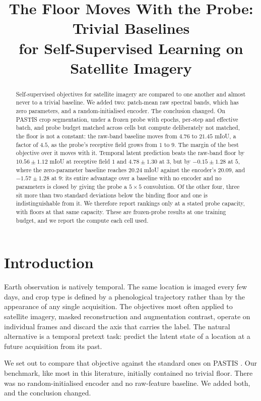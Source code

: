 \documentclass{article}
\title{The Floor Moves With the Probe: Trivial Baselines\\
       for Self-Supervised Learning on Satellite Imagery}
\author{}   %
\begin{document}
\maketitle

\begin{abstract}
Self-supervised objectives for satellite imagery are compared to one another and almost never to a
trivial baseline. We added two: patch-mean raw spectral bands, which has zero parameters, and a
random-initialised encoder. The conclusion changed. On PASTIS crop segmentation, under a frozen
probe with epochs, per-step and effective batch, and probe budget matched across cells but compute
deliberately not matched, the floor is not a constant: the raw-band baseline moves from $4.76$ to $21.45$ mIoU, a factor of $4.5$, as the probe's
receptive field grows from $1$ to $9$. The margin of the best objective over it moves with it.
Temporal latent prediction beats the raw-band floor by $10.56 \pm 1.12$ mIoU at receptive field $1$
and $4.78 \pm 1.30$ at $3$, but by $-0.15 \pm 1.28$ at $5$, where the zero-parameter baseline reaches
$20.24$ mIoU against the encoder's $20.09$, and $-1.57 \pm 1.28$ at $9$: its entire advantage over a
baseline with no encoder and no parameters is closed by giving the probe a $5{\times}5$ convolution. Of the other four, three sit more than two standard deviations below the
binding floor and one is indistinguishable from it. We therefore report rankings only at a stated
probe capacity, with floors at that same capacity. These are frozen-probe results at one training
budget, and we report the compute each cell used.
\end{abstract}

\section{Introduction}

Earth observation is natively temporal. The same location is imaged every few days, and crop type is
defined by a phenological trajectory rather than by the appearance of any single acquisition. The
objectives most often applied to satellite imagery, masked reconstruction and augmentation contrast,
operate on individual frames and discard the axis that carries the label. The natural alternative is a
temporal pretext task: predict the latent state of a location at a future acquisition from its past.

We set out to compare that objective against the standard ones on PASTIS
\citep{garnot2021pastis}. Our benchmark, like most in this literature, initially contained no trivial
floor. There was no random-initialised encoder and no raw-feature baseline. We added both, and the
conclusion changed.
\end{document}
